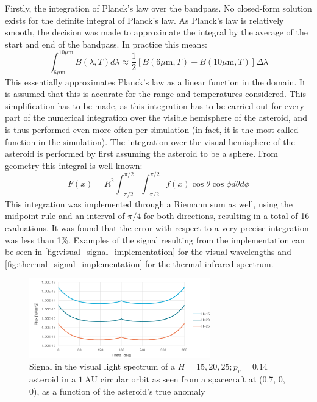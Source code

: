 Firstly, the integration of Planck's law over the bandpass. No closed-form solution exists for the definite integral of Planck's law. As Planck's law is relatively smooth, the decision was made to approximate the integral by the average of the start and end of the bandpass. In practice this means:
\begin{equation}
 \int _{6 \mu\mathrm{m}}^{10 \mu\mathrm{m}} B(\lambda, T) d\lambda \approx \frac{1}{2}\left[B(6 \mu\mathrm{m}, T) + B(10 \mu\mathrm{m}, T)\right] \Delta \lambda
\end{equation}
This essentially approximates Planck's law as a linear function in the domain. It is assumed that this is accurate for the range and temperatures considered. This simplification has to be made, as this integration has to be carried out for every part of the numerical integration over the visible hemisphere of the asteroid, and is thus performed even more often per simulation (in fact, it is the most-called function in the simulation). The integration over the visual hemisphere of the asteroid is performed by first assuming the asteroid to be a sphere. From geometry this integral is well known:
\begin{equation}
 F(x) = R^2\int_{-\pi/2}^{\pi/2}\int_{-\pi/2}^{\pi/2} f(x) \cos \theta \cos \phi d \theta d \phi
\end{equation}
This integration was implemented through a Riemann sum as well, using the midpoint rule and an interval of $\pi/4$ for both directions, resulting in a total of 16 evaluations. It was found that the error with respect to a very precise integration was less than 1\%. Examples of the signal resulting from the implementation can be seen in \autoref{fig:visual_signal_implementation} for the visual wavelengths and \autoref{fig:thermal_signal_implementation} for the thermal infrared spectrum.

\begin{figure}[htbp]
 \centering
 \includegraphics[width=0.7\textwidth]{img/implementation_vis_signal.png}
 \caption{Signal in the visual light spectrum of a $H=15, 20, 25; p_v=0.14$ asteroid in a $1~\mathrm{AU}$ circular orbit as seen from a spacecraft at (0.7, 0, 0), as a function of the asteroid's true anomaly}
 \label{fig:visual_signal_implementation}
\end{figure}



